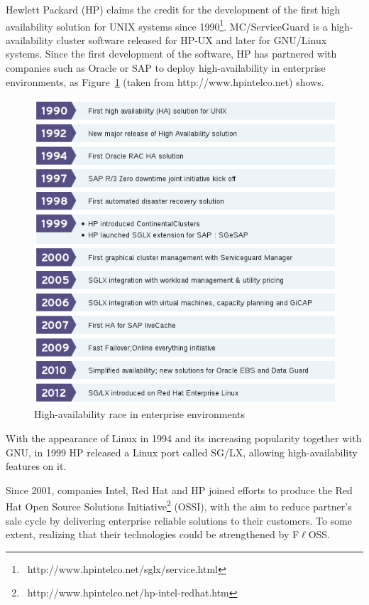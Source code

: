 \documentclass[a4paper, 12pt]{book}
\begin{document}
Hewlett Packard (HP) claims the credit for the development of the first high availability solution for UNIX systems since 1990\footnote{{\tiny\ http://www.hpintelco.net/sglx/service.html}}. MC/ServiceGuard is a high-availability cluster software released for HP-UX and later for GNU/Linux systems. Since the first development of the software, HP has partnered with companies such as Oracle or SAP to deploy high-availability in enterprise environments, as Figure~\ref{fig:enterprise} (taken from http://www.hpintelco.net) shows.\bigskip

\begin{figure}
  \centering
  \includegraphics[scale=0.70]{commercial-ha.png}
  \caption[High-availability race in enterprise environments]{High-availability race in enterprise environments}
  \label{fig:enterprise}
\end{figure}

\noindent With the appearance of Linux in 1994 and its increasing popularity together with GNU, in 1999 HP released a Linux port called SG/LX, allowing high-availability features on it.\bigskip

\noindent Since 2001, companies Intel, Red Hat and HP joined efforts to produce the Red Hat Open Source Solutions Initiative\footnote{{\tiny\ http://www.hpintelco.net/hp-intel-redhat.htm}} (OSSI), with the aim to reduce partner's sale cycle by delivering enterprise reliable solutions to their customers. To some extent, realizing that their technologies could be strengthened by F$\ell$OSS.\bigskip
\end{document}
